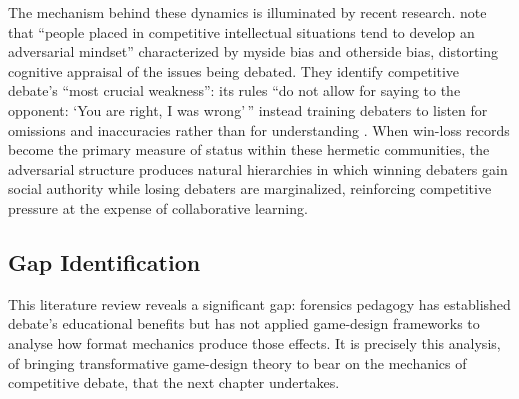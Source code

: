 The mechanism behind these dynamics is illuminated by recent research. \textcite{prussikora2025cracovian} note that ``people placed in competitive intellectual situations tend to develop an adversarial mindset'' characterized by myside bias and otherside bias, distorting cognitive appraisal of the issues being debated. They identify competitive debate's ``most crucial weakness'': its rules ``do not allow for saying to the opponent: `You are right, I was wrong'\,'' instead training debaters to listen for omissions and inaccuracies rather than for understanding \parencite[p.~1474]{prussikora2025cracovian}. When win-loss records become the primary measure of status within these hermetic communities, the adversarial structure produces natural hierarchies in which winning debaters gain social authority while losing debaters are marginalized, reinforcing competitive pressure at the expense of collaborative learning.

\subsection{Gap Identification}

This literature review reveals a significant gap: forensics pedagogy has established debate's educational benefits but has not applied game-design frameworks to analyse how format mechanics produce those effects. It is precisely this analysis, of bringing transformative game-design theory to bear on the mechanics of competitive debate, that the next chapter undertakes.
